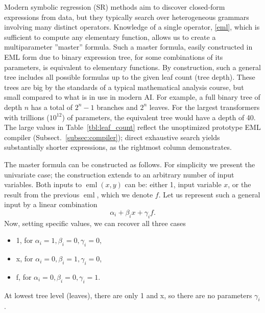 \documentclass[12pt]{article}
\DeclareMathOperator{\eml}{eml}
\begin{document}
Modern symbolic regression (SR) methods \cite{udrescu2020ai,cranmer2020discovering,cranmer2023pysr} aim to discover closed-form expressions from data, but they typically search over heterogeneous grammars involving many distinct operators. Knowledge of a single operator, \eqref{eml}, which is sufficient to compute any elementary function, allows us to create a multiparameter ''master'' formula. Such a master formula, easily constructed in EML form due to binary expression tree, for some combinations of its parameters, is equivalent to elementary functions. By construction, such a general tree includes all possible formulas up to the given leaf count (tree depth). These trees are big by the standards of a typical mathematical analysis course, but small compared to what is in use in modern AI. For example, a full binary tree of depth $n$ has a total of $2^n-1$ branches and $2^n$ leaves. For the largest transformers with trillions ($10^{12}$) of parameters, the equivalent tree would have a depth of 40. The large values in Table~\ref{tbl:leaf_count} reflect the unoptimized prototype EML compiler (Subsect.~\ref{subsec:compiler}); direct exhaustive search yields substantially shorter expressions, as the rightmost column demonstrates.  



The master formula can be constructed as follows. For simplicity we present the univariate case; the construction extends to an arbitrary number of input variables.
Both inputs to $\eml{(x,y)}$ can be: either 1, input variable $x$, or the result from the previous $\eml$, which we denote $f$. Let us represent such a general input by a linear combination
\begin{equation}
\label{3inputs}
\alpha_i + \beta_i x + \gamma_i f.    
\end{equation}
Now, setting specific values, we can recover all three cases
\begin{itemize}
\item 1, for $\alpha_i=1, \beta_i=0, \gamma_i=0$, 
\item x, for $\alpha_i=0, \beta_i=1, \gamma_i=0$, 
\item f, for $\alpha_i=0, \beta_i=0, \gamma_i=1$. 
\end{itemize}
At lowest tree level (leaves), there are only 1 and x, so there are no parameters $\gamma_i$.
\end{document}
